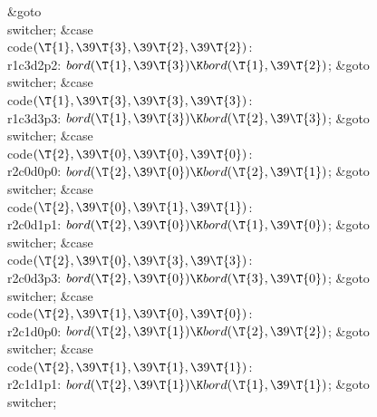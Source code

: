 \&{goto} \\{switcher};\6
\4\&{case} \\{code}${}(\T{1},\39\T{3},\39\T{2},\39\T{2}){}$:\5
\\{r1c3d2p2}:\5
${}\\{bord}(\T{1},\39\T{3})\K\\{bord}(\T{1},\39\T{2}){}$;\5
\&{goto} \\{switcher};\6
\4\&{case} \\{code}${}(\T{1},\39\T{3},\39\T{3},\39\T{3}){}$:\5
\\{r1c3d3p3}:\5
${}\\{bord}(\T{1},\39\T{3})\K\\{bord}(\T{2},\39\T{3}){}$;\5
\&{goto} \\{switcher};\6
\4\&{case} \\{code}${}(\T{2},\39\T{0},\39\T{0},\39\T{0}){}$:\5
\\{r2c0d0p0}:\5
${}\\{bord}(\T{2},\39\T{0})\K\\{bord}(\T{2},\39\T{1}){}$;\5
\&{goto} \\{switcher};\6
\4\&{case} \\{code}${}(\T{2},\39\T{0},\39\T{1},\39\T{1}){}$:\5
\\{r2c0d1p1}:\5
${}\\{bord}(\T{2},\39\T{0})\K\\{bord}(\T{1},\39\T{0}){}$;\5
\&{goto} \\{switcher};\6
\4\&{case} \\{code}${}(\T{2},\39\T{0},\39\T{3},\39\T{3}){}$:\5
\\{r2c0d3p3}:\5
${}\\{bord}(\T{2},\39\T{0})\K\\{bord}(\T{3},\39\T{0}){}$;\5
\&{goto} \\{switcher};\6
\4\&{case} \\{code}${}(\T{2},\39\T{1},\39\T{0},\39\T{0}){}$:\5
\\{r2c1d0p0}:\5
${}\\{bord}(\T{2},\39\T{1})\K\\{bord}(\T{2},\39\T{2}){}$;\5
\&{goto} \\{switcher};\6
\4\&{case} \\{code}${}(\T{2},\39\T{1},\39\T{1},\39\T{1}){}$:\5
\\{r2c1d1p1}:\5
${}\\{bord}(\T{2},\39\T{1})\K\\{bord}(\T{1},\39\T{1}){}$;\5
\&{goto} \\{switcher};\6
